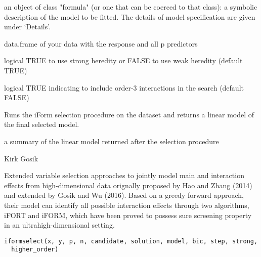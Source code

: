 \documentclass[a4paper]{book}
\begin{document}
\begin{Arguments}
\begin{ldescription}
\item[\code{formula}] an object of class "formula" (or one that can be coerced to that class): a symbolic description of the model to be fitted. The details of model specification are given under ‘Details’.

\item[\code{data}] data.frame of your data with the response and all p predictors

\item[\code{strong}] logical TRUE to use strong heredity or FALSE to use weak heredity (default TRUE)

\item[\code{higher\_order}] logical TRUE indicating to include order-3 interactions in the search (default FALSE)
\end{ldescription}
\end{Arguments}
%
\begin{Details}\relax
Runs the iForm selection procedure on the dataset and returns a linear model
of the final selected model.
\end{Details}
%
\begin{Value}
a summary of the linear model returned after the selection procedure
\end{Value}
%
\begin{Author}\relax
Kirk Gosik
\end{Author}
%
\begin{Description}\relax
Extended variable selection approaches to jointly model main and interaction effects from high-dimensional data orignally proposed by Hao and Zhang (2014) and extended by Gosik and Wu (2016).
Based on a greedy forward approach, their model can identify all possible interaction effects through two algorithms, iFORT and iFORM, which have been proved to possess sure screening property in an ultrahigh-dimensional setting.
\end{Description}
%
\begin{Usage}
\begin{verbatim}
iformselect(x, y, p, n, candidate, solution, model, bic, step, strong,
  higher_order)
\end{verbatim}
\end{Usage}
%
\end{document}
